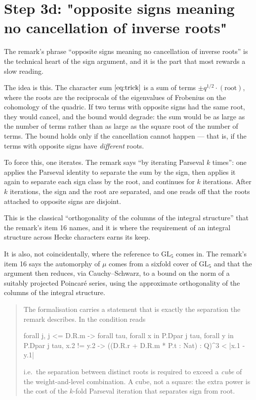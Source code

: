 \section{Step 3d: "opposite signs meaning no cancellation of inverse roots"}The remark's phrase ``opposite signs meaning no cancellation of inverse
roots'' is the technical heart of the sign argument, and it is the part that
most rewards a slow reading.

The idea is this. The character sum $\eqref{eq:trick}$ is a sum of terms
$\pm q^{1/2}\cdot(\text{root})$, where the roots are the reciprocals of the
eigenvalues of Frobenius on the cohomology of the quadric. If two terms with
opposite signs had the same root, they would cancel, and the bound would
degrade: the sum would be as large as the number of terms rather than as large
as the square root of the number of terms. The bound holds only if the
cancellation cannot happen --- that is, if the terms with opposite signs have
\emph{different} roots.

To force this, one iterates. The remark says ``by iterating Parseval $k$
times'': one applies the Parseval identity to separate the sum by the sign,
then applies it again to separate each sign class by the root, and continues
for $k$ iterations. After $k$ iterations, the sign and the root are separated,
and one reads off that the roots attached to opposite signs are disjoint.

This is the classical ``orthogonality of the columns of the integral
structure'' that the remark's item 16 names, and it is where the requirement
of an integral structure across Hecke characters earns its keep.

It is also, not coincidentally, where the reference to $\mathrm{GL}_5$ comes
in. The remark's item 16 says the automorphy of $\mu$ comes from a sixfold
cover of $\mathrm{GL}_5$ and that the argument then reduces, via
Cauchy--Schwarz, to a bound on the norm of a suitably projected Poincar\'e
series, using the approximate orthogonality of the columns of the integral
structure.

\begin{quote}
The formalisation carries a statement that is exactly the separation the remark
describes. In
the condition  reads
{\footnotesize
\begin{leanquote}
forall j, j <= D.R.m -> forall tau, forall x in P.Dpar j
  tau,
  forall y in P.Dpar j tau, x.2 != y.2 ->
    ((D.R.r + D.R.m * P.t : Nat) : Q)^3 < |x.1 - y.1|
\end{leanquote}
}
i.e.\ the separation between distinct roots is required to exceed a
\emph{cube} of the weight-and-level combination. A cube, not a square: the
extra power is the cost of the $k$-fold Parseval iteration that separates
sign from root.
\end{quote}

